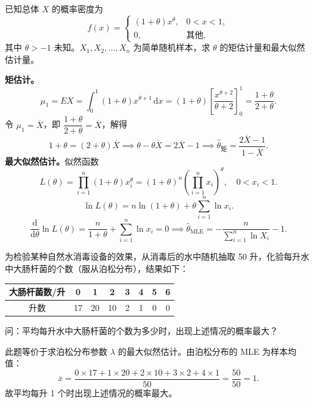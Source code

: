 \documentclass[lang=cn,11pt]{elegantbook}
\begin{document}
\begin{exercise}[矩估计与最大似然估计] \label{ex:est_02}
已知总体 \(X\) 的概率密度为
\[
f(x)=
\begin{cases}
(1+\theta)x^\theta, & 0<x<1,\\
0, & \text{其他},
\end{cases}
\]
其中 \(\theta>-1\) 未知。\(X_1,X_2,\dots,X_n\) 为简单随机样本，求 \(\theta\) 的矩估计量和最大似然估计量。
\end{exercise}
\begin{solution}
\textbf{矩估计。}
\[
\mu_1=EX=\int_0^1(1+\theta)x^{\theta+1}\,\mathrm{d}x=(1+\theta)\left[\frac{x^{\theta+2}}{\theta+2}\right]_0^1=\frac{1+\theta}{2+\theta}.
\]
令 \(\mu_1=\overline{X}\)，即 \(\dfrac{1+\theta}{2+\theta}=\overline{X}\)，解得
\[
1+\theta=(2+\theta)\overline{X}\implies \theta-\theta\overline{X}=2\overline{X}-1\implies \hat{\theta}_{\text{矩}}=\frac{2\overline{X}-1}{1-\overline{X}}.
\]
\textbf{最大似然估计。}似然函数
\[
L(\theta)=\prod_{i=1}^{n}(1+\theta)x_i^\theta=(1+\theta)^n\left(\prod_{i=1}^{n}x_i\right)^{\!\theta},\quad 0<x_i<1.
\]
\[
\ln L(\theta)=n\ln(1+\theta)+\theta\sum_{i=1}^{n}\ln x_i.
\]
\[
\frac{\mathrm{d}}{\mathrm{d}\theta}\ln L(\theta)=\frac{n}{1+\theta}+\sum_{i=1}^{n}\ln x_i=0
\implies \hat{\theta}_{\text{MLE}}=-\frac{n}{\displaystyle\sum_{i=1}^{n}\ln X_i}-1.
\]
\end{solution}


\begin{exercise}\label{exer:7-poisson-bacteria}
为检验某种自然水消毒设备的效果，从消毒后的水中随机抽取 50 升，化验每升水中大肠杆菌的个数（服从泊松分布），结果如下：
\begin{center}
\begin{tabular}{c|ccccccc}
大肠杆菌数/升 & 0 & 1 & 2 & 3 & 4 & 5 & 6 \\
\hline
升数 & 17 & 20 & 10 & 2 & 1 & 0 & 0
\end{tabular}
\end{center}
问：平均每升水中大肠杆菌的个数为多少时，出现上述情况的概率最大？
\end{exercise}
\begin{solution}
此题等价于求泊松分布参数 \(\lambda\) 的最大似然估计。由泊松分布的 MLE 为样本均值：
\[
\overline{x} = \frac{0\times17+1\times20+2\times10+3\times2+4\times1}{50} = \frac{50}{50} = 1.
\]
故平均每升 1 个时出现上述情况的概率最大。
\end{solution}
\end{document}

